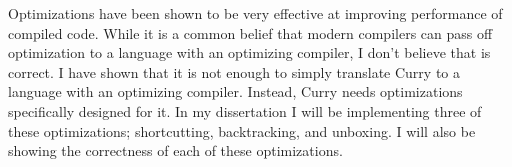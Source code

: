 Optimizations have been shown to be very effective at improving performance of compiled code.
While it is a common belief that modern compilers can pass off optimization
to a language with an optimizing compiler, I don't believe that is correct.
I have shown that it is not enough to simply translate Curry to a language with an optimizing compiler.
Instead, Curry needs optimizations specifically designed for it.
In my dissertation I will be implementing three of these optimizations; 
shortcutting, backtracking, and unboxing.
I will also be showing the correctness of each of these optimizations.


